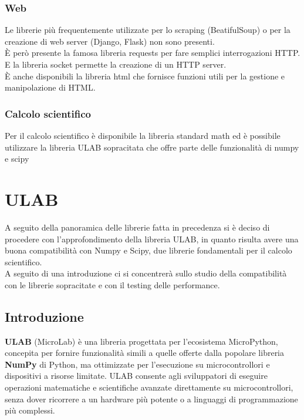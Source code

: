 \documentclass[12pt,a4paper]{report}
\begin{document}
\subsection{Web}\label{web}

Le librerie più frequentemente utilizzate per lo scraping (BeatifulSoup)
o per la creazione di web server (Django, Flask) non sono presenti.\\
È però presente la famosa libreria requests per fare semplici
interrogazioni HTTP. E la libreria socket permette la creazione di un
HTTP server.\\
È anche disponibili la libreria html che fornisce funzioni utili per la
gestione e manipolazione di HTML.

\subsection{Calcolo scientifico}\label{calcolo-scientifico}

Per il calcolo scientifico è disponibile la libreria standard math ed è
possibile utilizzare la libreria ULAB \cite{ulab}
sopracitata che offre parte delle funzionalità di numpy e scipy

\chapter{ULAB}\label{ulab}

A seguito della panoramica delle librerie fatta in precedenza si è
deciso di procedere con l'approfondimento della libreria
ULAB, in quanto risulta avere una buona compatibilità con Numpy e Scipy,
due librerie fondamentali per il calcolo scientifico.\\
A seguito di una introduzione ci si concentrerà sullo studio della
compatibilità con le librerie sopracitate e con il testing delle
performance.

\section{Introduzione}\label{introduzione-1}

\textbf{ULAB} (MicroLab) è una libreria progettata per
l'ecosistema MicroPython, concepita per fornire
funzionalità simili a quelle offerte dalla popolare libreria
\textbf{NumPy} di Python, ma ottimizzate per
l'esecuzione su microcontrollori e dispositivi a risorse
limitate. ULAB consente agli sviluppatori di eseguire operazioni
matematiche e scientifiche avanzate direttamente su microcontrollori,
senza dover ricorrere a un hardware più potente o a linguaggi di
programmazione più complessi.
\end{document}
